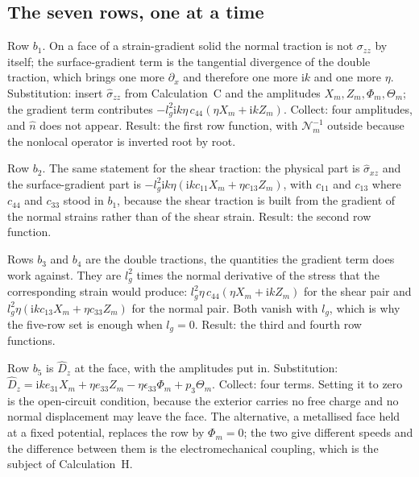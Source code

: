 \documentclass[11pt]{article}
\makeatletter
\newif\ifshowworked
\newenvironment{worked}{%
  \ifshowworked\par\smallskip\noindent\textit{Working.}\par\smallskip\else
  \setbox\z@\vbox\bgroup\fi}{\ifshowworked\par\smallskip\else\egroup\fi}
\newcommand{\ii}{\mathrm{i}}
\newcommand{\Ncal}{\mathcal{N}}
\makeatother
\begin{document}
\subsection*{The seven rows, one at a time}

\begin{worked}
Row $b_1$. On a face of a strain-gradient solid the normal traction is not $\sigma_{zz}$ by itself; the
surface-gradient term is the tangential divergence of the double traction, which brings one more
$\partial_x$ and therefore one more $\ii k$ and one more $\eta$. Substitution: insert
$\hat\sigma_{zz}$ from Calculation~C and the amplitudes $X_m,Z_m,\Phi_m,\Theta_m$; the gradient term
contributes $-l_g^2\ii k\eta\,c_{44}(\eta X_m+\ii kZ_m)$. Collect: four amplitudes, and $\hat n$ does not
appear. Result: the first row function, with $\Ncal_m^{-1}$ outside because the nonlocal operator is
inverted root by root.
\end{worked}

\begin{worked}
Row $b_2$. The same statement for the shear traction: the physical part is $\hat\sigma_{xz}$ and the
surface-gradient part is $-l_g^2\ii k\eta(\ii kc_{11}X_m+\eta c_{13}Z_m)$, with $c_{11}$ and $c_{13}$
where $c_{44}$ and $c_{33}$ stood in $b_1$, because the shear traction is built from the gradient of the
normal strains rather than of the shear strain. Result: the second row function.
\end{worked}

\begin{worked}
Rows $b_3$ and $b_4$ are the double tractions, the quantities the gradient term does work against. They
are $l_g^2$ times the normal derivative of the stress that the corresponding strain would produce:
$l_g^2\eta\,c_{44}(\eta X_m+\ii kZ_m)$ for the shear pair and $l_g^2\eta(\ii kc_{13}X_m+\eta c_{33}Z_m)$
for the normal pair. Both vanish with $l_g$, which is why the five-row set is enough when $l_g=0$.
Result: the third and fourth row functions.
\end{worked}

\begin{worked}
Row $b_5$ is $\hat D_z$ at the face, with the amplitudes put in. Substitution:
$\hat D_z=\ii ke_{31}X_m+\eta e_{33}Z_m-\eta\epsilon_{33}\Phi_m+p_3\Theta_m$. Collect: four terms. Setting
it to zero is the open-circuit condition, because the exterior carries no free charge and no normal
displacement may leave the face. The alternative, a metallised face held at a fixed potential, replaces
the row by $\Phi_m=0$; the two give different speeds and the difference between them is the
electromechanical coupling, which is the subject of Calculation~H.
\end{worked}
\end{document}
